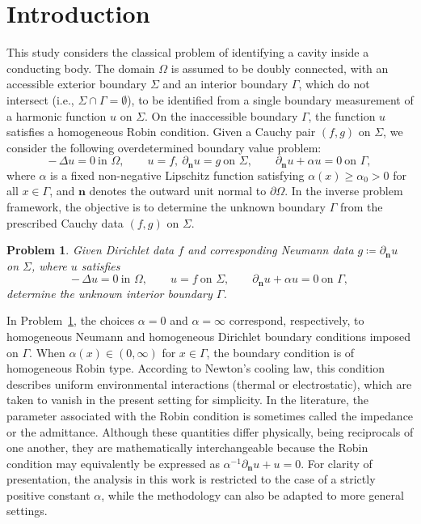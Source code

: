 \documentclass[a4paper,11pt]{article}
\newtheorem{problem}{Problem}
\newcommand{\vect}[1]{\boldsymbol{\mathbf{#1}}}
\newcommand{\nn}{\vect{n}}
\begin{document}
\section{Introduction}
\label{sec:Introduction} 
%
This study considers the classical problem of identifying a cavity inside a conducting body.  
The domain $\varOmega$ is assumed to be doubly connected, with an accessible exterior boundary $\varSigma$ and an interior boundary $\varGamma$, which do not intersect (i.e., $\varSigma \cap \varGamma = \emptyset$), to be identified from a single boundary measurement of a harmonic function $u$ on $\varSigma$.  
On the inaccessible boundary $\varGamma$, the function $u$ satisfies a homogeneous Robin condition.  
Given a Cauchy pair $(f,g)$ on $\varSigma$, we consider the following overdetermined boundary value problem:
%
\begin{equation}
\label{eq:gip}
-\,\Delta u = 0 \ \text{in } \varOmega, \qquad 
u = f, \ \partial_{\nn}u = g \ \text{on } \varSigma, \qquad 
\partial_{\nn}u + \alpha u = 0 \ \text{on } \varGamma,
\end{equation}
%
where $\alpha$ is a fixed non-negative Lipschitz function satisfying $\alpha(x) \geqslant \alpha_{0} > 0$ for all $x \in \varGamma$, and $\nn$ denotes the outward unit normal to $\partial\varOmega$.  
In the inverse problem framework, the objective is to determine the unknown boundary $\varGamma$ from the prescribed Cauchy data $(f,g)$ on $\varSigma$.
%
%
%
\begin{problem}\label{eq:inverse_problem}
Given Dirichlet data $f$ and corresponding Neumann data $g \coloneqq \partial_{\nn}u$ on $\varSigma$, where $u$ satisfies
    \begin{equation}
    \label{eq:state}
    -\,\Delta u = 0 \ \text{in } \varOmega, \qquad
    u = f \ \text{on } \varSigma, \qquad
    \partial_{\nn}u + \alpha u = 0 \ \text{on } \varGamma,
    \end{equation}
determine the unknown interior boundary $\varGamma$.
\end{problem}
%
In Problem~\ref{eq:inverse_problem}, the choices $\alpha = 0$ and $\alpha = \infty$ correspond, respectively, to homogeneous Neumann and homogeneous Dirichlet boundary conditions imposed on $\varGamma$. 
When $\alpha(x) \in (0,\infty)$ for $x \in \varGamma$, the boundary condition is of homogeneous Robin type. According to Newton’s cooling law, this condition describes uniform environmental interactions (thermal or electrostatic), which are taken to vanish in the present setting for simplicity. In the literature, the parameter associated with the Robin condition is sometimes called the impedance or the admittance. Although these quantities differ physically, being reciprocals of one another, they are mathematically interchangeable because the Robin condition may equivalently be expressed as $\alpha^{-1} \partial_{\nn} u + u = 0$. 
For clarity of presentation, the analysis in this work is restricted to the case of a strictly positive constant $\alpha$, while the methodology can also be adapted to more general settings.
\end{document}
